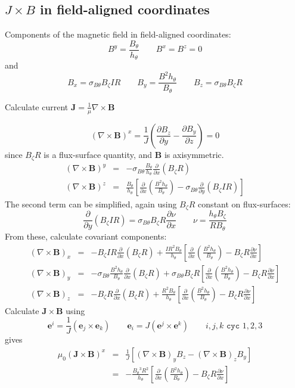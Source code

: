 \documentclass[12pt]{article}
\newcommand{\sbt}{\ensuremath{\sigma_{B\theta}}}
\newcommand{\deriv}[2]{\ensuremath{\frac{\partial #1}{\partial #2}}}
\newcommand{\hthe}{\ensuremath{h_\theta}}
\newcommand{\Bp}{\ensuremath{B_\theta}}
\newcommand{\Bt}{\ensuremath{B_\zeta}}
\newcommand{\Vec}[1]{\ensuremath{\mathbf{#1}}}
\newcommand{\Bvec}{\Vec{B}}
\newcommand{\Jvec}{\Vec{J}}
\newcommand{\Curl}[1]{\ensuremath{\nabla\times #1 }}
\begin{document}
\subsection{$J\times B$ in field-aligned coordinates}
\label{sec:jxb_fac}

Components of the magnetic field in field-aligned coordinates:
\[
B^y = \frac{\Bp}{\hthe} \qquad B^x = B^z = 0
\]
and
\[
B_x = \sbt\Bt I R \qquad B_y = \frac{B^2\hthe}{\Bp} \qquad B_z = \sbt\Bt R
\]

Calculate current $\Jvec = \frac{1}{\mu}\Curl{\Bvec}$

\[
\left(\Curl{\Bvec}\right)^x = \frac{1}{J}\left(\deriv{B_z}{y} - \deriv{B_y}{z}\right) = 0
\]
since $\Bt R$ is a flux-surface quantity, and $\Bvec$ is axisymmetric.
\begin{eqnarray*}
\left(\Curl{\Bvec}\right)^y &=& -\sbt\frac{\Bp}{\hthe}\deriv{}{x}\left(\Bt R\right) \\
\left(\Curl{\Bvec}\right)^z &=& \frac{\Bp}{\hthe}\left[\deriv{}{x}\left(\frac{B^2\hthe}{\Bp}\right) - \sbt\deriv{}{y}\left(\Bt I R\right)\right]
\end{eqnarray*}
The second term can be simplified, again using $\Bt R$ constant on flux-surfaces:
\[
\deriv{}{y}\left(\Bt I R\right) = \sbt\Bt R\deriv{\nu}{x} \qquad \nu = \frac{\hthe\Bt}{R\Bp}
\]
From these, calculate covariant components:
\begin{eqnarray}
\left(\Curl{\Bvec}\right)_x &=& -\Bt I R \deriv{}{x}\left(\Bt R\right) + \frac{IR^2\Bp}{\hthe}\left[\deriv{}{x}\left(\frac{B^2\hthe}{\Bp}\right) - \Bt R\deriv{\nu}{x}\right] \nonumber\\
\left(\Curl{\Bvec}\right)_y &=& -\sbt\frac{B^2\hthe}{\Bp}\deriv{}{x}\left(\Bt R\right) + \sbt\Bt R\left[\deriv{}{x}\left(\frac{B^2\hthe}{\Bp}\right) - \Bt R\deriv{\nu}{x}\right] \label{eq:curlb_y}\\
\left(\Curl{\Bvec}\right)_z &=& -\Bt R\deriv{}{x}\left(\Bt R\right) + \frac{R^2\Bp}{\hthe}\left[\deriv{}{x}\left(\frac{B^2\hthe}{\Bp}\right) - \Bt R\deriv{\nu}{x}\right] \nonumber
\end{eqnarray}
Calculate $\Jvec\times\Bvec$ using
\begin{equation}
\mathbf{e}^i = \frac{1}{J}\left(\mathbf{e}_j \times \mathbf{e}_k\right) \qquad \mathbf{e}_i = J\left(\mathbf{e}^j \times \mathbf{e}^k\right) \qquad i,j,k \texttt{ cyc } 1,2,3
\label{eq:cross_relation}
\end{equation}
gives 
\begin{eqnarray*}
\mu_0 \left(\Jvec\times\Bvec\right)^x &=& \frac{1}{J}\left[\left(\Curl{\Bvec}\right)_y B_z - \left(\Curl{\Bvec}\right)_z B_y \right]\\
&=& -\frac{\Bp^3 R^2}{\hthe}\left[\deriv{}{x}\left(\frac{B^2\hthe}{\Bp}\right) - \Bt R\deriv{\nu}{x}\right]
\end{eqnarray*}
\end{document}
